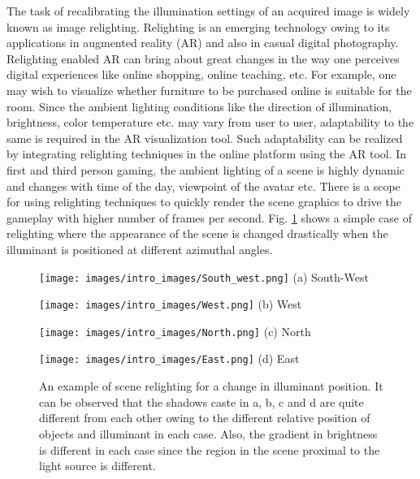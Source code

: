 \documentclass[runningheads]{llncs}
\begin{document}
\par The task of recalibrating the illumination settings of an acquired image is widely known as image relighting. Relighting is an emerging technology owing to its applications in augmented reality (AR) and also in casual digital photography. Relighting enabled AR can bring about  great changes in the way one perceives digital experiences like online shopping, online teaching, etc. For example, one may wish to visualize whether furniture to be purchased online is suitable for the room. Since the ambient lighting conditions like the direction of illumination, brightness, color temperature etc. may vary from user to user, adaptability to the same is required in the AR visualization tool. Such adaptability can be realized by integrating relighting techniques in the online platform using the AR tool. In first and third person gaming, the ambient lighting of a scene is highly dynamic and changes with time of the day, viewpoint of the avatar etc. There is a scope for using relighting techniques to quickly render the scene graphics to drive the gameplay with higher number of frames per second. Fig. \ref{fig:intro_pic} shows a simple case of relighting where the appearance of the scene is changed drastically when the illuminant is positioned at different azimuthal angles.

\begin{figure}
\centering
\newcommand\x{0.24}
\newcommand\scale{0.15}
  \begin{minipage}{\x\linewidth}
		\begin{center}
		\texttt{[image: images/intro\_images/South\_west.png]}
		\fontsize{8}{12pt}\selectfont (a) South-West
		\end{center}
  \end{minipage}
  \begin{minipage}{\x\linewidth}
		\begin{center}
		\texttt{[image: images/intro\_images/West.png]}
		\fontsize{8}{12pt}\selectfont (b) West
		\end{center}
  \end{minipage}
  \begin{minipage}{\x\linewidth}
	\begin{center}
	\texttt{[image: images/intro\_images/North.png]}
	\fontsize{8}{12pt}\selectfont (c) North
  \end{center}
  \end{minipage}
  \begin{minipage}{\x\linewidth}
		\begin{center}
		\texttt{[image: images/intro\_images/East.png]}
		\fontsize{8}{12pt}\selectfont (d) East
		\end{center}
  \end{minipage}
\caption{An example of scene relighting for a change in illuminant position. It can be observed that the shadows caste in a, b, c and d are quite different from each other owing to the different relative position of objects and illuminant in each case. Also, the gradient in brightness is different in each case since the region in the scene proximal to the light source is different.}
\label{fig:intro_pic}
\end{figure}
\end{document}
